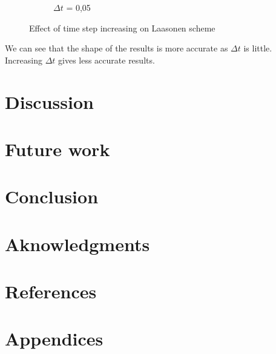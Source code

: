 \documentclass{article}
\begin{document}
\begin{figure}[H]
\begin{subfigure}[b]{0.45\textwidth}
                \caption{$\Delta t$ = 0,05}
            \end{subfigure}
            \caption{Effect of time step increasing on Laasonen scheme}
        \end{figure}
        We can see that the shape of the results is more accurate as $\Delta t$ is little.
        Increasing $\Delta t$ gives less accurate results.
    \newpage
    \section{Discussion}

    \newpage
    \section{Future work}

    \newpage
    \section{Conclusion}

    \newpage
    \section{Aknowledgments}

    \newpage
    \section{References}

    \newpage
    \section{Appendices}
\end{document}
